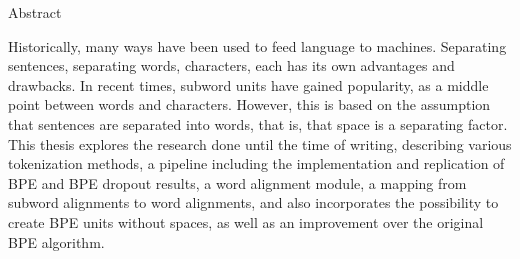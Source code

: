 %
%

\begin{center}
    \huge
    Abstract
    \vspace{1cm}
\end{center}

Historically, many ways have been used to feed language to machines. Separating sentences, separating words, characters, each has its own advantages and drawbacks. In recent times, subword units have gained popularity, as a middle point between words and characters. However, this is based on the assumption that sentences are separated into words, that is, that space is a separating factor. This thesis explores the research done until the time of writing, describing various tokenization methods, a pipeline including the implementation and replication of BPE and BPE dropout results, a word alignment module, a mapping from subword alignments to word alignments, and also incorporates the possibility to create BPE units without spaces, as well as an improvement over the original BPE algorithm.

